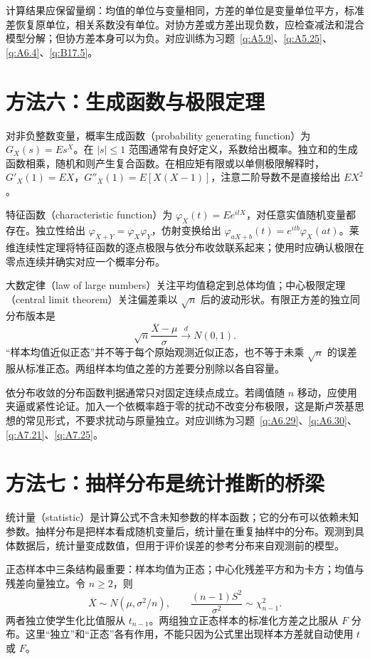 \documentclass[UTF8,12pt,a4paper,fontset=fandol]{ctexbook}
\begin{document}
计算结果应保留量纲：均值的单位与变量相同，方差的单位是变量单位平方，标准差恢复原单位，相关系数没有单位。对协方差或方差出现负数，应检查减法和混合模型分解；但协方差本身可以为负。对应训练为习题~\ref{q:A5.9}、\ref{q:A5.25}、\ref{q:A6.4}、\ref{q:B17.5}。

\section*{方法六：生成函数与极限定理}
对非负整数变量，概率生成函数（probability generating function）为 $G_X(s)=Es^X$。在 $|s|\le1$ 范围通常有良好定义，系数给出概率。独立和的生成函数相乘，随机和则产生复合函数。在相应矩有限或以单侧极限解释时，$G'_X(1)=EX$，$G''_X(1)=E[X(X-1)]$，注意二阶导数不是直接给出 $EX^2$。

特征函数（characteristic function）为 $\varphi_X(t)=Ee^{itX}$，对任意实值随机变量都存在。独立性给出 $\varphi_{X+Y}=\varphi_X\varphi_Y$，仿射变换给出 $\varphi_{aX+b}(t)=e^{itb}\varphi_X(at)$。莱维连续性定理将特征函数的逐点极限与依分布收敛联系起来；使用时应确认极限在零点连续并确实对应一个概率分布。

大数定律（law of large numbers）关注平均值稳定到总体均值；中心极限定理（central limit theorem）关注偏差乘以 $\sqrt n$ 后的波动形状。有限正方差的独立同分布版本是
\[
\sqrt n\frac{\overline X-\mu}{\sigma}\xrightarrow dN(0,1).
\]
“样本均值近似正态”并不等于每个原始观测近似正态，也不等于未乘 $\sqrt n$ 的误差服从标准正态。两组样本均值之差的方差要分别除以各自容量。

依分布收敛的分布函数判据通常只对固定连续点成立。若阈值随 $n$ 移动，应使用夹逼或紧性论证。加入一个依概率趋于零的扰动不改变分布极限，这是斯卢茨基思想的常见形式，不要求扰动与原量独立。对应训练为习题~\ref{q:A6.29}、\ref{q:A6.30}、\ref{q:A7.21}、\ref{q:A7.25}。

\section*{方法七：抽样分布是统计推断的桥梁}
统计量（statistic）是计算公式不含未知参数的样本函数；它的分布可以依赖未知参数。抽样分布是把样本看成随机变量后，统计量在重复抽样中的分布。观测到具体数据后，统计量变成数值，但用于评价误差的参考分布来自观测前的模型。

正态样本中三条结构最重要：样本均值为正态；中心化残差平方和为卡方；均值与残差向量独立。令 $n\ge2$，则
\[
\overline X\sim N(\mu,\sigma^2/n),\qquad\frac{(n-1)S^2}{\sigma^2}\sim\chi^2_{n-1}.
\]
两者独立使学生化比值服从 $t_{n-1}$。两组独立正态样本的标准化方差之比服从 $F$ 分布。这里“独立”和“正态”各有作用，不能只因为公式里出现样本方差就自动使用 $t$ 或 $F$。
\end{document}
